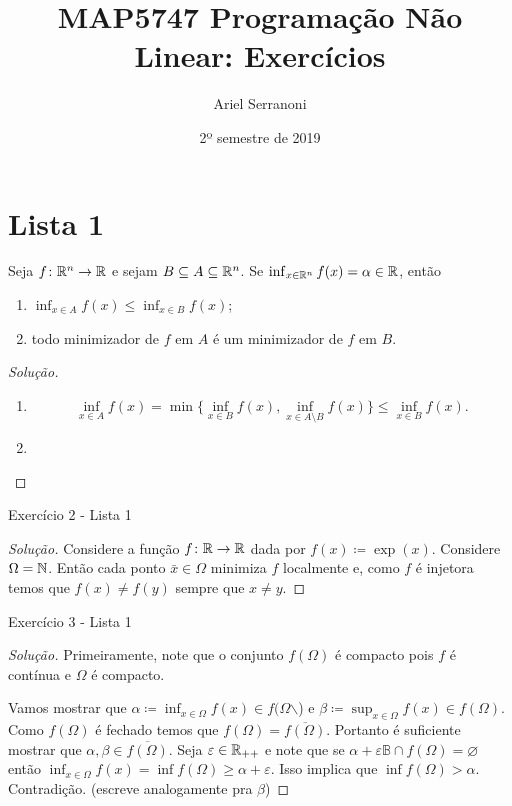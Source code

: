\documentclass[12pt,twoside,a4paper]{article}
\title{MAP5747 Programação Não Linear: Exercícios}
\author{Ariel Serranoni}
\date{2º semestre de 2019}
\begin{document}
\maketitle

\section*{Lista 1}

\begin{problema}
Seja \(f\colon\mathbb{R}^n\to\mathbb{R}\) e sejam \(B\subseteq A\subseteq\mathbb{R}^n\). Se
\(\inf_{x\in\mathbb{R}^n}f(x)=\alpha\in\mathbb{R}\), então
\begin{enumerate}[label=(\roman*)]
\item \(\inf_{x\in A}f(x)\leq\inf_{x\in B}f(x)\);
\item todo minimizador de \(f\) em \(A\) é um minimizador de \(f\) em \(B\).
\end{enumerate}
\end{problema}
\begin{proof}[Solução]\hfill
  \begin{enumerate}[label=(\roman*)]
  \item \[\inf_{x\in A} f(x)=\min\{\inf_{x\in B}f(x), \inf_{x\in A\setminus B}f(x)\}\leq\inf_{x\in B}f(x).\]
  \item
    \end{enumerate}
\end{proof}

\begin{problema}
Exercício 2 - Lista 1
\end{problema}
\begin{proof}[Solução]
Considere a função \(f\colon\mathbb{R}\to\mathbb{R}\) dada por \(f(x)\coloneqq\exp(x)\). Considere \(\Omega=\mathbb{N}\).
Então cada ponto \(\bar{x}\in\Omega\) minimiza \(f\) localmente e, como \(f\) é injetora temos que \(f(x)\not=f(y)\)
sempre que \(x\not= y\).
\end{proof}

\begin{problema}
Exercício 3 - Lista 1 
\end{problema}
\begin{proof}[Solução]
Primeiramente, note que o conjunto \(f(\Omega)\) é compacto pois \(f\) é contínua e \(\Omega\) é compacto.

Vamos mostrar que \(\alpha\coloneqq\inf_{x\in\Omega}f(x)\in f(\Omega\)$\backslash$) e \(\beta\coloneqq\sup_{x\in\Omega}f(x)\in f(\Omega)\).
Como \(f(\Omega)\) é fechado temos que \(f(\Omega)=\overline{f(\Omega)}\). Portanto é suficiente mostrar que 
\(\alpha,\beta\in\overline{f(\Omega)}\). Seja \(\varepsilon\in\mathbb{R}_{++}\) e note que se \(\alpha +\varepsilon\mathbb{B}\cap f(\Omega)=\varnothing\) então \(\inf_{x\in\Omega}f(x)=\inf f(\Omega)\geq\alpha+\varepsilon\).
Isso implica que \(\inf f(\Omega) > \alpha\). Contradição. (escreve analogamente pra \(\beta\))
\end{proof}
\end{document}

